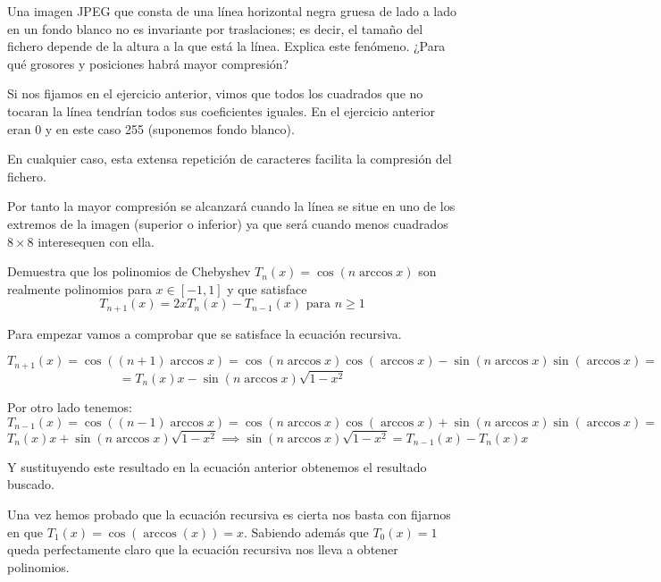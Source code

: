 \begin{problem}[8]
Una imagen JPEG que consta de una línea horizontal negra gruesa de lado a lado
en un fondo blanco no es invariante por traslaciones; es decir, el tamaño del fichero depende de la altura a la que está la línea. Explica este fenómeno. ¿Para qué grosores y posiciones habrá mayor compresión?

\solution


Si nos fijamos en el ejercicio anterior, vimos que todos los cuadrados que no tocaran la línea tendrían todos sus coeficientes iguales. En el ejercicio anterior eran 0 y en este caso 255 (suponemos fondo blanco).

En cualquier caso, esta extensa repetición de caracteres facilita la compresión del fichero.

Por tanto la mayor compresión se alcanzará cuando la línea se situe en uno de los extremos de la imagen (superior o inferior) ya que será cuando menos cuadrados $8\times 8$ interesequen con ella.

\end{problem}

\begin{problem}[9]
Demuestra que los polinomios de Chebyshev $T_n(x)=\cos(n \arccos x)$ son realmente polinomios para $x \in [-1,1]$ y que satisface
\[T_{n+1}(x)=2xT_n(x)-T_{n-1}(x) \text{ para } n \geq 1\]
\solution


Para empezar vamos a comprobar que se satisface la ecuación recursiva.

\[T_{n+1}(x)=\cos((n+1)\arccos x) = \cos(n\arccos x)\cos(\arccos x)-\sin(n \arccos x)\sin(\arccos x) =\]
\[=T_n(x)x-\sin(n \arccos x)\sqrt{1-x^2}\]

Por otro lado tenemos:
\[T_{n-1}(x)=\cos((n-1)\arccos x) = \cos(n\arccos x)\cos(\arccos x)+\sin(n \arccos x)\sin(\arccos x) =\]
\[T_n(x)x+\sin(n \arccos x)\sqrt{1-x^2} \implies \sin(n \arccos x)\sqrt{1-x^2} =T_{n-1}(x)-T_n(x)x\]

Y sustituyendo este resultado en la ecuación anterior obtenemos el resultado buscado.

Una vez hemos probado que la ecuación recursiva es cierta nos basta con fijarnos en que $T_1(x)=\cos(\arccos(x))=x$. Sabiendo además que $T_0(x)=1$ queda perfectamente claro que la ecuación recursiva nos lleva a obtener polinomios.

\end{problem}


